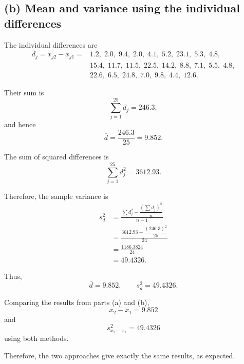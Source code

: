 \documentclass[12pt,a4paper]{article}
\begin{document}
\subsection*{(b) Mean and variance using the individual differences}

The individual differences are
\[
\begin{aligned}
d_j=x_{j2}-x_{j1}
={}&
1.2,\;2.0,\;9.4,\;2.0,\;4.1,\;5.2,\;23.1,\;5.3,\;4.8,\\
&15.4,\;11.7,\;11.5,\;22.5,\;14.2,\;8.8,\;7.1,\;5.5,\;4.8,\\
&22.6,\;6.5,\;24.8,\;7.0,\;9.8,\;4.4,\;12.6.
\end{aligned}
\]

Their sum is
\[
\sum_{j=1}^{25}d_j=246.3,
\]
and hence
\[
\overline{d}
=
\frac{246.3}{25}
=
\boxed{9.852}.
\]

The sum of squared differences is
\[
\sum_{j=1}^{25}d_j^2=3612.93.
\]

Therefore, the sample variance is
\[
\begin{aligned}
s_d^2
&=
\frac{
\sum d_j^2-\dfrac{(\sum d_j)^2}{n}
}{n-1}\\
&=
\frac{
3612.93-\dfrac{(246.3)^2}{25}
}{24}\\
&=
\frac{1186.3824}{24}\\
&=
\boxed{49.4326}.
\end{aligned}
\]

Thus,
\[
\boxed{
\overline{d}=9.852,
\qquad
s_d^2=49.4326.
}
\]

Comparing the results from parts (a) and (b),
\[
\boxed{
\overline{x_2-x_1}=9.852
}
\]
and
\[
\boxed{
s_{x_2-x_1}^2=49.4326
}
\]
using both methods.

Therefore, the two approaches give exactly the same results, as expected.
\end{document}
